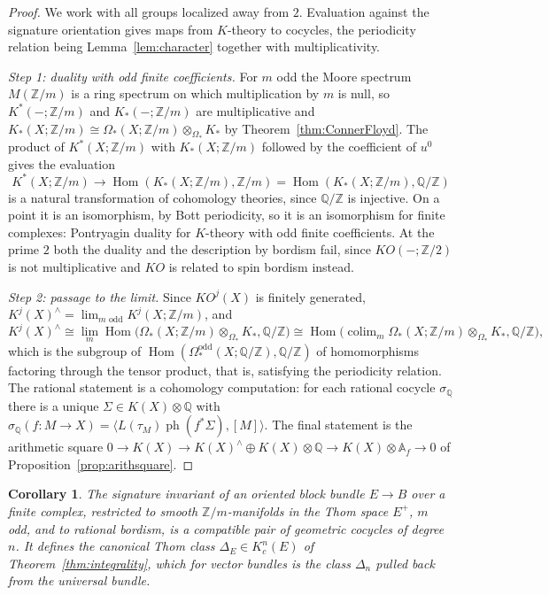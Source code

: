 \documentclass[11pt]{amsart}
\theoremstyle{plain}
\newtheorem{corollary}[theorem]{Corollary}
\theoremstyle{definition}
\numberwithin{equation}{section}
\newcommand{\Z}{\mathbb{Z}}
\newcommand{\Q}{\mathbb{Q}}
\newcommand{\Af}{\mathbb{A}_f}
\newcommand{\KO}{\mathit{KO}}
\DeclareMathOperator{\Hom}{Hom}
\DeclareMathOperator{\ph}{ph}
\DeclareMathOperator{\colim}{colim}
\begin{document}
\begin{proof}
We work with all groups localized away from $2$.
Evaluation against the signature orientation gives maps from $K$-theory to cocycles, the periodicity relation being Lemma~\ref{lem:character} together with multiplicativity.

\emph{Step 1: duality with odd finite coefficients.}
For $m$ odd the Moore spectrum $M(\Z/m)$ is a ring spectrum on which multiplication by $m$ is null, so $K^*(-;\Z/m)$ and $K_*(-;\Z/m)$ are multiplicative and $K_*(X;\Z/m)\cong\Omega_*(X;\Z/m)\otimes_{\Omega_*}K_*$ by Theorem~\ref{thm:ConnerFloyd}.
The product of $K^*(X;\Z/m)$ with $K_*(X;\Z/m)$ followed by the coefficient of $u^0$ gives the evaluation
\[
K^*(X;\Z/m)\longrightarrow\Hom(K_*(X;\Z/m),\Z/m)=\Hom(K_*(X;\Z/m),\Q/\Z)
\]
is a natural transformation of cohomology theories, since $\Q/\Z$ is injective.
On a point it is an isomorphism, by Bott periodicity, so it is an isomorphism for finite complexes: Pontryagin duality for $K$-theory with odd finite coefficients.
At the prime $2$ both the duality and the description by bordism fail, since $\KO(-;\Z/2)$ is not multiplicative and $\KO$ is related to spin bordism instead.

\emph{Step 2: passage to the limit.}
Since $\KO^j(X)$ is finitely generated, $K^j(X)^\wedge=\lim_{m\text{ odd}}K^j(X;\Z/m)$, and
\[
K^j(X)^\wedge\cong\lim_m\Hom\bigl(\Omega_*(X;\Z/m)\otimes_{\Omega_*}K_*,\Q/\Z\bigr)\cong\Hom\bigl(\colim_m\Omega_*(X;\Z/m)\otimes_{\Omega_*}K_*,\Q/\Z\bigr),
\]
which is the subgroup of $\Hom(\Omega^{\mathrm{odd}}_*(X;\Q/\Z),\Q/\Z)$ of homomorphisms factoring through the tensor product, that is, satisfying the periodicity relation.
The rational statement is a cohomology computation: for each rational cocycle $\sigma_\Q$ there is a unique $\Sigma\in K(X)\otimes\Q$ with $\sigma_\Q(f\colon M\to X)=\langle L(\tau_M)\ph(f^*\Sigma),[M]\rangle$.
The final statement is the arithmetic square $0\to K(X)\to K(X)^\wedge\oplus K(X)\otimes\Q\to K(X)\otimes\Af\to0$ of Proposition~\ref{prop:arithsquare}.
\end{proof}

\begin{corollary}\label{cor:Korientation}
The signature invariant of an oriented block bundle $E\to B$ over a finite complex, restricted to smooth $\Z/m$-manifolds in the Thom space $E^+$, $m$ odd, and to rational bordism, is a compatible pair of geometric cocycles of degree $n$.
It defines the canonical Thom class $\Delta_E\in K^n_c(E)$ of Theorem~\ref{thm:integrality}, which for vector bundles is the class $\Delta_{n}$ pulled back from the universal bundle.
\end{corollary}
\end{document}
